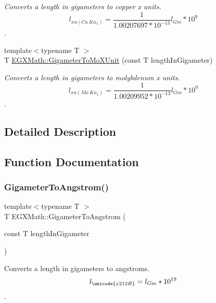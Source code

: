 \begin{DoxyCompactItemize}
\begin{DoxyCompactList}\small\item\em Converts a length in gigameters to copper x units. \[ l_{xu(Cu\ K\alpha_1)}= \frac{1}{1.00207697*10^{-13}} l_{Gm} * 10^{9}\]. \end{DoxyCompactList}\item 
{\footnotesize template$<$typename T $>$ }\\T \mbox{\hyperlink{group___e_g_x_math-_conversions-_length_conversions-_gigameter-_non-_s_i_gac30ae06633de77b05d859ffb3cd2a577}{E\+G\+X\+Math\+::\+Gigameter\+To\+Mo\+X\+Unit}} (const T length\+In\+Gigameter)
\begin{DoxyCompactList}\small\item\em Converts a length in gigameters to molybdenum x units. \[ l_{xu(Mo\ K\alpha_1)}=\frac{1}{1.00209952*10^{-13}} l_{Gm} * 10^{9}\]. \end{DoxyCompactList}\end{DoxyCompactItemize}


\subsection{Detailed Description}


\subsection{Function Documentation}
\mbox{\label{group___e_g_x_math-_conversions-_length_conversions-_gigameter-_non-_s_i_ga622e85e3f663039f3802b29d25655989}} 
\subsubsection{\texorpdfstring{Gigameter\+To\+Angstrom()}{GigameterToAngstrom()}}
{\footnotesize\ttfamily template$<$typename T $>$ \\
T E\+G\+X\+Math\+::\+Gigameter\+To\+Angstrom (\begin{DoxyParamCaption}\item[{const T}]{length\+In\+Gigameter }\end{DoxyParamCaption})}



Converts a length in gigameters to angstroms. \[ l_{\unicode{x212B}}=l_{Gm} * 10^{19} \]. 

